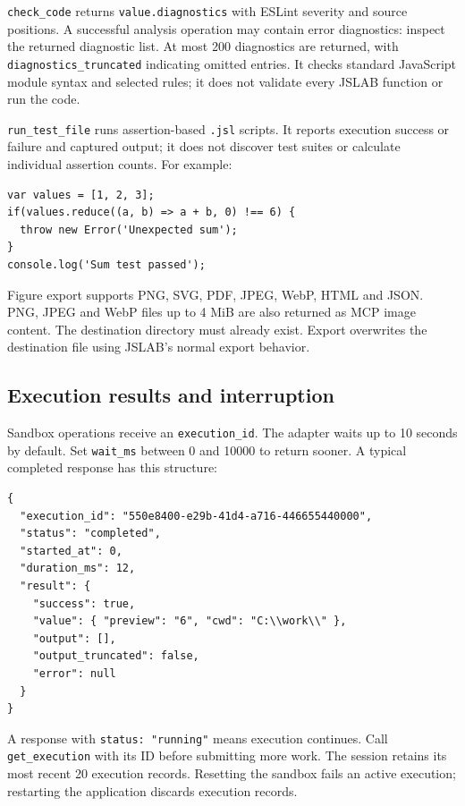 \documentclass[12pt,a4paper]{article}
\begin{document}
\texttt{check\_code} returns \texttt{value.diagnostics} with ESLint severity and source positions. A successful analysis operation may contain error diagnostics: inspect the returned diagnostic list. At most 200 diagnostics are returned, with \texttt{diagnostics\_truncated} indicating omitted entries. It checks standard JavaScript module syntax and selected rules; it does not validate every JSLAB function or run the code.

\texttt{run\_test\_file} runs assertion-based \texttt{.jsl} scripts. It reports execution success or failure and captured output; it does not discover test suites or calculate individual assertion counts. For example:

\begin{lstlisting}[style=JavaScriptStyle,language={}]
var values = [1, 2, 3];
if(values.reduce((a, b) => a + b, 0) !== 6) {
  throw new Error('Unexpected sum');
}
console.log('Sum test passed');
\end{lstlisting}

Figure export supports PNG, SVG, PDF, JPEG, WebP, HTML and JSON. PNG, JPEG and WebP files up to 4 MiB are also returned as MCP image content. The destination directory must already exist. Export overwrites the destination file using JSLAB's normal export behavior.


\subsection{Execution results and interruption}

Sandbox operations receive an \texttt{execution\_id}. The adapter waits up to 10 seconds by default. Set \texttt{wait\_ms} between 0 and 10000 to return sooner. A typical completed response has this structure:

\begin{lstlisting}[style=JavaScriptStyle,language={}]
{
  "execution_id": "550e8400-e29b-41d4-a716-446655440000",
  "status": "completed",
  "started_at": 0,
  "duration_ms": 12,
  "result": {
    "success": true,
    "value": { "preview": "6", "cwd": "C:\\work\\" },
    "output": [],
    "output_truncated": false,
    "error": null
  }
}
\end{lstlisting}

A response with \texttt{status: "running"} means execution continues. Call \texttt{get\_execution} with its ID before submitting more work. The session retains its most recent 20 execution records. Resetting the sandbox fails an active execution; restarting the application discards execution records.
\end{document}
